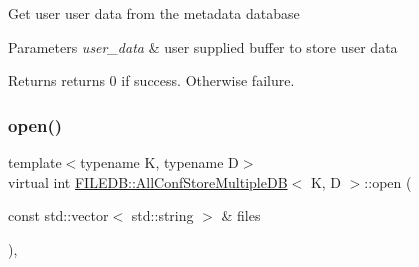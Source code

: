 Get user user data from the metadata database


\begin{DoxyParams}{Parameters}
{\em user\+\_\+data} & user supplied buffer to store user data \\
\hline
\end{DoxyParams}
\begin{DoxyReturn}{Returns}
returns 0 if success. Otherwise failure. 
\end{DoxyReturn}
\mbox{\label{classFILEDB_1_1AllConfStoreMultipleDB_aa006283e8d6f0f079ca234c369f53679}} 
\subsubsection{\texorpdfstring{open()}{open()}\hspace{0.1cm}{\footnotesize\ttfamily [1/2]}}
{\footnotesize\ttfamily template$<$typename K, typename D$>$ \\
virtual int \mbox{\hyperlink{classFILEDB_1_1AllConfStoreMultipleDB}{F\+I\+L\+E\+D\+B\+::\+All\+Conf\+Store\+Multiple\+DB}}$<$ K, D $>$\+::open (\begin{DoxyParamCaption}\item[{const std\+::vector$<$ std\+::string $>$ \&}]{files }\end{DoxyParamCaption})\hspace{0.3cm}{\ttfamily [inline]}, {\ttfamily [virtual]}}


